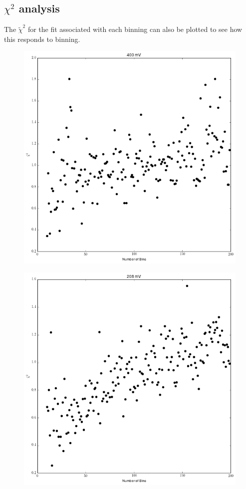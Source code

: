 \documentclass[11pt,letterpaper]{article}
\begin{document}
\subsection{$\chi^2$ analysis}
The $\tilde{\chi}^2$ for the fit associated with each binning can also be plotted to see how this responds to binning. 
\begin{figure}[h!]
  \centering
      \includegraphics[scale=.7]{ChiSq_400.png}
      \caption{}
      \label{fig:400_Chi}
\end{figure}
\begin{figure}[h!]
  \centering
      \includegraphics[scale=.7]{ChiSq_208.png}
      \caption{}
      \label{fig:208_Chi}
\end{figure}
\end{document}
